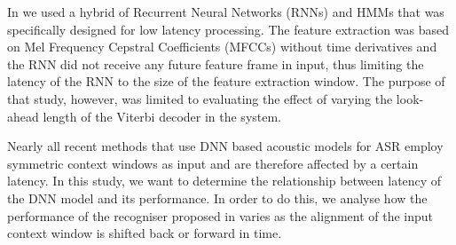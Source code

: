 In \cite{gs:Salvi2006} we used a hybrid of Recurrent Neural Networks (RNNs) and HMMs that was specifically designed for low latency processing.
The feature extraction was based on Mel Frequency Cepstral Coefficients (MFCCs) without time derivatives and the RNN did not receive any future feature frame in input, thus limiting the latency of the RNN to the size of the feature extraction window.
The purpose of that study, however, was limited to evaluating the effect of varying the look-ahead length of the Viterbi decoder in the system.

Nearly all recent methods that use DNN based acoustic models for ASR employ symmetric context windows as input \cite{Mohamed12, pdnn, dbn09, YaoEtAl2012SLTadaptation, DahlEtAl2011ICASSP} and are therefore affected by a certain latency.
In this study, we want to determine the relationship between latency of the DNN model and its performance.
In order to do this, we analyse how the performance of the recogniser proposed in \cite{pdnn} varies as the alignment of the input context window is shifted back or forward in time. 


